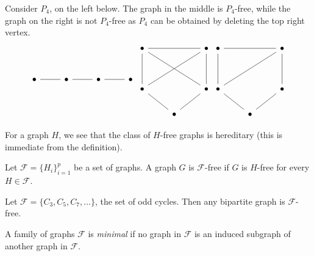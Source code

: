 \begin{example}
  Consider $P_4$, on the left below. The graph in the middle is $P_4$-free, while the graph on the right is not $P_4$-free as $P_4$ can be obtained by deleting the top right vertex.
  \[\begin{tikzcd}
      \bullet & \bullet & \bullet & \bullet
      \arrow[no head, from=1-4, to=1-3]
      \arrow[no head, from=1-3, to=1-2]
      \arrow[no head, from=1-2, to=1-1]
    \end{tikzcd}
    \begin{tikzcd}
      \bullet && \bullet \\
      \\
      \bullet && \bullet \\
      & \bullet
      \arrow[no head, from=1-1, to=3-1]
      \arrow[no head, from=3-1, to=4-2]
      \arrow[no head, from=4-2, to=3-3]
      \arrow[no head, from=3-3, to=1-3]
      \arrow[no head, from=1-3, to=1-1]
      \arrow[no head, from=1-1, to=3-3]
      \arrow[no head, from=3-1, to=1-3]
    \end{tikzcd}
    \begin{tikzcd}
      \bullet && \bullet \\
      \\
      \bullet && \bullet \\
      & \bullet
      \arrow[no head, from=1-1, to=3-1]
      \arrow[no head, from=3-1, to=4-2]
      \arrow[no head, from=4-2, to=3-3]
      \arrow[no head, from=3-3, to=1-3]
      \arrow[no head, from=1-3, to=1-1]
      \arrow[no head, from=3-1, to=1-3]
    \end{tikzcd}\]
\end{example}

For a graph $H$, we see that the class of $H$-free graphs is hereditary (this is immediate from the definition).

\begin{definition}
  Let $\mathcal F = \{H_i\}_{i=1}^p$ be a set of graphs. A graph $G$ is $\mathcal F$-free if $G$ is $H$-free for every $H \in \mathcal F$.
\end{definition}

\begin{example}
  Let $\mathcal F = \{C_3, C_5, C_7, \ldots\}$, the set of odd cycles. Then any bipartite graph is $\mathcal F$-free.
\end{example}

\begin{definition}[Minimal]
  A family of graphs $\mathcal F$ is \emph{minimal} if no graph in $\mathcal F$ is an induced subgraph of another graph in $\mathcal F$.
\end{definition}

